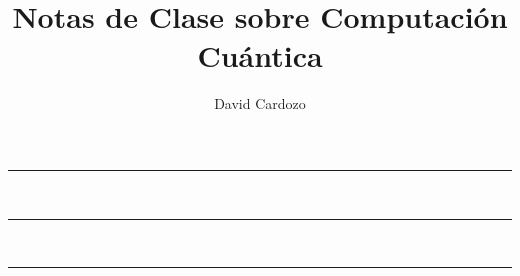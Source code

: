 \documentclass[notitlepage]{article}
\author{David Cardozo}
\title{Notas de Clase sobre Computación Cuántica}
\begin{document}



\noindent\rule{\textwidth}{1pt}\\[-0.1cm]


\noindent\rule{\textwidth}{1pt}\\[-0.1cm]

	

\noindent\rule{\textwidth}{1pt}\\[-0.1cm]

\end{document}
